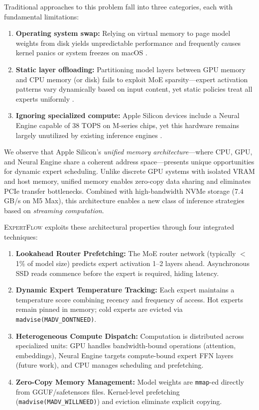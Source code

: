 \documentclass[11pt]{article}
\begin{document}
Traditional approaches to this problem fall into three categories, each with fundamental limitations:

\begin{enumerate}
    \item \textbf{Operating system swap:} Relying on virtual memory to page model weights from disk yields unpredictable performance and frequently causes kernel panics or system freezes on macOS \cite{orion2025}.

    \item \textbf{Static layer offloading:} Partitioning model layers between GPU memory and CPU memory (or disk) fails to exploit MoE sparsity—expert activation patterns vary dynamically based on input content, yet static policies treat all experts uniformly \cite{hobbit2024,krasis2024}.

    \item \textbf{Ignoring specialized compute:} Apple Silicon devices include a Neural Engine capable of 38 TOPS on M-series chips, yet this hardware remains largely unutilized by existing inference engines \cite{orion2025}.
\end{enumerate}

We observe that Apple Silicon's \textit{unified memory architecture}—where CPU, GPU, and Neural Engine share a coherent address space—presents unique opportunities for dynamic expert scheduling. Unlike discrete GPU systems with isolated VRAM and host memory, unified memory enables zero-copy data sharing and eliminates PCIe transfer bottlenecks. Combined with high-bandwidth NVMe storage (7.4 GB/s on M5 Max), this architecture enables a new class of inference strategies based on \textit{streaming computation}.

\textsc{ExpertFlow} exploits these architectural properties through four integrated techniques:

\begin{enumerate}
    \item \textbf{Lookahead Router Prefetching:} The MoE router network (typically $<$1\% of model size) predicts expert activation 1--2 layers ahead. Asynchronous SSD reads commence before the expert is required, hiding latency.

    \item \textbf{Dynamic Expert Temperature Tracking:} Each expert maintains a temperature score combining recency and frequency of access. Hot experts remain pinned in memory; cold experts are evicted via \texttt{madvise(MADV\_DONTNEED)}.

    \item \textbf{Heterogeneous Compute Dispatch:} Computation is distributed across specialized units: GPU handles bandwidth-bound operations (attention, embeddings), Neural Engine targets compute-bound expert FFN layers (future work), and CPU manages scheduling and prefetching.

    \item \textbf{Zero-Copy Memory Management:} Model weights are \texttt{mmap}-ed directly from GGUF/safetensors files. Kernel-level prefetching (\texttt{madvise(MADV\_WILLNEED)}) and eviction eliminate explicit copying.
\end{enumerate}
\end{document}
